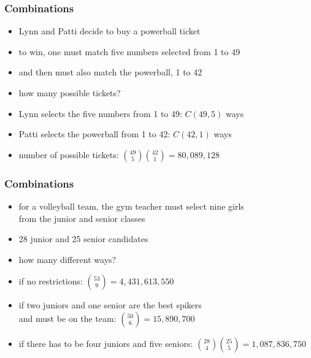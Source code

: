 \documentclass[dvipsnames]{beamer}
\begin{document}
\begin{frame}
  \frametitle{Combinations}
  
  \begin{example}
    \begin{itemize}
      \item Lynn and Patti decide to buy a powerball ticket
      \item to win, one must match five numbers selected from 1 to 49
      \item and then must also match the powerball, 1 to 42
      \item how many possible tickets?

      \pause
      \medskip
      \item Lynn selects the five numbers from 1 to 49: $C(49,5)$ ways
      \item Patti selects the powerball from 1 to 42: $C(42,1)$ ways
      \item number of possible tickets:
        ${49 \choose 5}{42 \choose 1} = 80,089,128$
    \end{itemize}
  \end{example}
\end{frame}

\begin{frame}
  \frametitle{Combinations}

  \begin{example}
    \begin{itemize}
      \item for a volleyball team, the gym teacher must select nine girls\\
        from the junior and senior classes
      \item 28 junior and 25 senior candidates
      \item how many different ways?

      \pause
      \medskip
      \item if no restrictions: ${53 \choose 9} = 4,431,613,550$
      \pause
      \item if two juniors and one senior are the best spikers\\
        and must be on the team: ${50 \choose 6} = 15,890,700$
      \pause
      \item if there has to be four juniors and five seniors:
        ${28 \choose 4}{25 \choose 5} = 1,087,836,750$
    \end{itemize}
  \end{example}
\end{frame}
\end{document}
